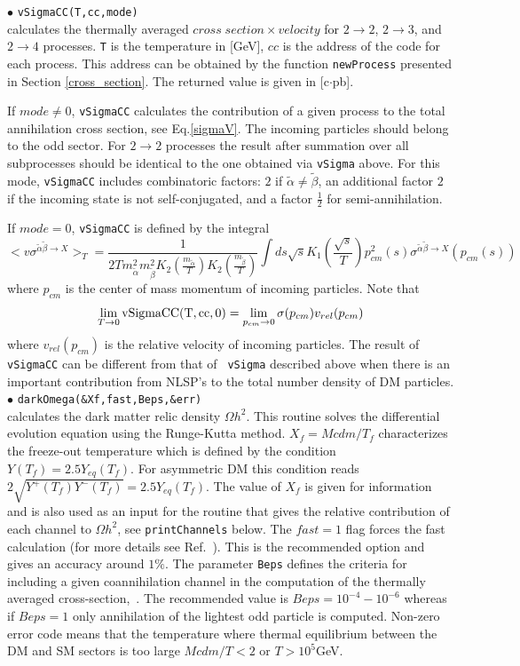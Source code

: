 \documentclass[12pt,a4paper]{article}
\begin{document}
 

\noindent
 $\bullet$    \verb|vSigmaCC(T,cc,mode)|\\
  calculates  the thermally  averaged  $cross\; section
\times velocity$ for $2\to2$, $2\to3$, and $2\to4$ processes. \verb|T| is the temperature in
[GeV],  $cc$ is the address of the code for each process. This address
can be obtained by the function {\tt newProcess} presented in  Section
\ref{cross_section}. The returned value  is given in [c$\cdot$pb]. 

 If $mode\ne 0$, \verb|vSigmaCC|  calculates  the contribution of a given
process to the total annihilation cross section,  see Eq.\ref{sigmaV}. The
 incoming particles should belong to the odd sector.  For $2\to2$ processes the result after summation over all subprocesses  should
be identical to the one obtained via {\tt vSigma}  above. For this mode,
\verb|vSigmaCC|  includes combinatoric factors: $2$ if $\tilde\alpha \ne
\tilde\beta$, an additional factor $2$ if the incoming state is not self-conjugated, and a factor
$\frac{1}{2}$  for semi-annihilation.   

If $mode=0$, {\tt vSigmaCC} is  defined by the integral
$$ <v \sigma^{\tilde\alpha\tilde\beta\to X}>_T=  \frac{1}{2 T
m_{\tilde\alpha}^2 m_{\tilde\beta}^2
K_2(\frac{m_{\tilde\alpha}}{T})K_2(\frac{m_{\tilde\beta}}{T})} \int ds \sqrt{s}
K_1(\frac{\sqrt{s}}{T})p_{cm}^2(s)\sigma^{\tilde\alpha\tilde\beta\to X}(p_{cm}(s))$$  
where $p_{cm}$ is the center of mass momentum of incoming particles.  Note that
$$\lim_{T\to 0} {\rm vSigmaCC(T,cc,0)}=\lim_{p_{cm}\to 0} \sigma(p_{cm}) v_{rel}(p_{cm}) $$ 
where   $v_{rel}(p_{cm})$ is the relative velocity of incoming particles.   The
result of {\tt vSigmaCC} can be different from that of {\tt
vSigma} described  above when there is an important contribution from NLSP's to the total
number density of DM particles. \\
 
\noindent 
$\bullet$ \verb|darkOmega(&Xf,fast,Beps,&err)|\\
calculates the dark matter relic density $\Omega h^2$. 
This routine  solves the differential evolution equation  using the Runge-Kutta method. 
$X_f=Mcdm/T_{f}$
characterizes the freeze-out temperature  which is defined by the
condition $Y(T_f)=2.5Y_{eq}(T_f)$. For  asymmetric  DM this condition
reads $2\sqrt{Y^+(T_f)Y^-(T_f)}=2.5Y_{eq}(T_f)$.  The value of $X_f$ is given for
information and is also used as an input for the routine that
gives the relative contribution of each channel to $\Omega h^2$,
see \verb|printChannels|  below. The  $fast=1$ flag forces the
fast calculation (for more details see
Ref.~\cite{Belanger:2004yn}). This is the recommended option and
gives an accuracy around $1\%$. The parameter {\tt Beps} defines the
criteria for including a given coannihilation channel in the computation of the
thermally averaged cross-section,~\cite{Belanger:2004yn}.   The
recommended value is $Beps=10^{-4} - 10^{-6}$ whereas 
if $Beps=1$ only annihilation of the
lightest odd particle is computed. Non-zero error code means that the temperature where thermal equilibrium between the DM and SM sectors is too large  $Mcdm/T < 2$  or
$T>10^{5}$GeV. 
\end{document}
